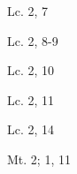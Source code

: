 \documentclass[a4paper,11pt,sans]{article}
\begin{document}
      \begin{multicols}{2}

      \columnbreak
          
      \end{multicols}
      \begin{center}
        Lc. 2, 7         
      \end{center}
      
      \begin{multicols}{2}

      \columnbreak
          
      \end{multicols}
      \begin{center}
        Lc. 2, 8-9         
      \end{center}
      
      \begin{multicols}{2}

      \columnbreak
          
      \end{multicols}
      \begin{center}
        Lc. 2, 10         
      \end{center}

      \begin{multicols}{2}

      \columnbreak
          
      \end{multicols}
      \begin{center}
        Lc. 2, 11       
      \end{center}
      
      \begin{multicols}{2}

      \columnbreak
          
      \end{multicols}
      \begin{center}
        Lc. 2, 14        
      \end{center}
      
      \begin{multicols}{2}

      \columnbreak
          
      \end{multicols}
      \begin{center}
        Mt. 2; 1, 11        
      \end{center}
      
\end{document}
